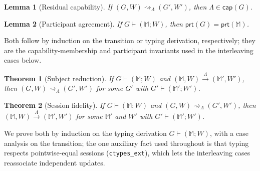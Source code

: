 \documentclass{article}
\theoremstyle{plain}
\newtheorem{theorem}{Theorem}
\newtheorem{lemma}{Lemma}
\theoremstyle{definition}
\newcommand{\reach}{\rightsquigarrow}
\newcommand{\id}[1]{\texttt{#1}}
\newcommand{\MM}{\mathbb{M}}
\newcommand{\cp}[1]{\mathsf{cap}(#1)}
\newcommand{\prt}[1]{\mathsf{prt}(#1)}
\def \bmr {}
\def \emr {}
\begin{document}
\begin{lemma}[Residual capability]\label{lem:res-cap}
If $(G,W)\reach_{\!\Lambda}(G',W')$, then $\Lambda\in\cp G$.
\end{lemma}
\begin{lemma}[Participant agreement]\label{lem:parts}
If $G\vdash(\MM;W)$, then $\prt G=\prt\MM$.
\end{lemma}
Both follow by induction on the transition or typing derivation, respectively;
they are the capability-membership and participant invariants used in the
interleaving cases below.
\begin{theorem}[Subject reduction]\label{thm:sr}
If $G\vdash(\MM;W)$ and $(\MM,W)\xrightarrow{\ \Lambda\ }(\MM',W')$, then
$(G,W)\reach_{\!\Lambda}(G',W')$ for some $G'$ with $G'\vdash(\MM';W')$.
\end{theorem}
\begin{theorem}[Session fidelity]\label{thm:sf}
If $G\vdash(\MM;W)$ and $(G,W)\reach_{\!\Lambda}(G',W')$, then
$(\MM,W)\xrightarrow{\ \Lambda\ }(\MM',W')$ for some $\MM'$ \bmr and $W'$ \emr with
$G'\vdash(\MM';W')$.
\end{theorem}
We prove both by induction on the typing derivation $G\vdash(\MM;W)$, with a
case analysis on the transition; the one auxiliary fact used throughout is that
typing respects pointwise-equal sessions (\id{ctypes\_ext}), which lets the
interleaving cases reassociate independent updates.
\end{document}
